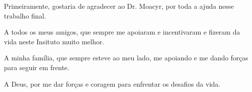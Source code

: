 Primeiramente, gostaria de agradecer ao Dr. Moacyr, por toda a ajuda nesse trabalho final.

A todos os meus amigos, que sempre me apoiaram e incentivaram e fizeram da vida neste Insituto muito melhor.

A minha família, que sempre esteve ao meu lado, me apoiando e me dando forças para seguir em frente.

A Deus, por me dar forças e coragem para enfrentar os desafios da vida.